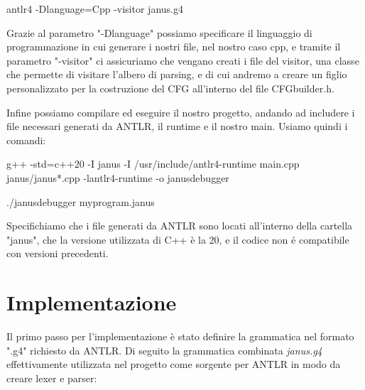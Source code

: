 \documentclass{article}
\theoremstyle{plain}
\theoremstyle{definition}
\theoremstyle{plain}
\begin{document}
\noindent antlr4 -Dlanguage=Cpp -visitor janus.g4\smallskip

Grazie al parametro "-Dlanguage" possiamo specificare il linguaggio di programmazione in cui generare i nostri file, nel nostro caso cpp, e tramite il parametro "-visitor" ci assicuriamo che vengano creati i file del visitor, una classe che permette di visitare l'albero di parsing, e di cui andremo a creare un figlio personalizzato per la costruzione del CFG all'interno del file CFGbuilder.h.

Infine possiamo compilare ed eseguire il nostro progetto, andando ad includere i file necessari generati da ANTLR, il runtime e il nostro main. Usiamo quindi i comandi:\smallskip

\noindent g++ -std=c++20 -I janus -I /usr/include/antlr4-runtime main.cpp janus/janus*.cpp -lantlr4-runtime -o janusdebugger\smallskip

\noindent ./janusdebugger myprogram.janus\smallskip

Specifichiamo che i file generati da ANTLR sono locati all'interno della cartella "janus", che la versione utilizzata di C++ è la 20, e il codice non é compatibile con versioni precedenti.

\newpage
\section{Implementazione}

Il primo passo per l'implementazione è stato definire la grammatica nel formato ".g4" richiesto da ANTLR. Di seguito la grammatica combinata \emph{janus.g4} effettivamente utilizzata nel progetto come sorgente per ANTLR in modo da creare lexer e parser:
\end{document}
